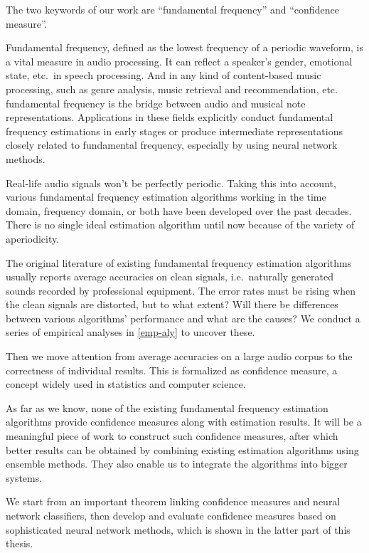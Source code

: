 \documentclass[11pt,a4paper]{report}
\begin{document}
The two keywords of our work are \enquote{fundamental frequency} and \enquote{confidence measure}.

\bigskip

Fundamental frequency, defined as the lowest frequency of a periodic waveform, is a vital measure in audio processing.
It can reflect a speaker's gender, emotional state, etc.\ in speech processing.
And in any kind of content-based music processing, such as genre analysis, music retrieval and recommendation, etc.\, fundamental frequency is the bridge between audio and musical note representations.
Applications in these fields explicitly conduct fundamental frequency estimations in early stages or produce intermediate representations closely related to fundamental frequency, especially by using neural network methods.

Real-life audio signals won't be perfectly periodic.
Taking this into account, various fundamental frequency estimation algorithms working in the time domain, frequency domain, or both have been developed over the past decades.
There is no single ideal estimation algorithm until now because of the variety of aperiodicity.

The original literature of existing fundamental frequency estimation algorithms usually reports average accuracies on clean signals, i.e.\, naturally generated sounds recorded by professional equipment.
The error rates must be rising when the clean signals are distorted, but to what extent? Will there be differences between various algorithms' performance and what are the causes? We conduct a series of empirical analyses in \autoref{emp-aly} to uncover these.

\bigskip

Then we move attention from average accuracies on a large audio corpus to the correctness of individual results.
This is formalized as confidence measure, a concept widely used in statistics and computer science.

As far as we know, none of the existing fundamental frequency estimation algorithms provide confidence measures along with estimation results.
It will be a meaningful piece of work to construct such confidence measures, after which better results can be obtained by combining existing estimation algorithms using ensemble methods.
They also enable us to integrate the algorithms into bigger systems.

We start from an important theorem linking confidence measures and neural network classifiers, then develop and evaluate confidence measures based on sophisticated neural network methods, which is shown in the latter part of this thesis.
\end{document}
